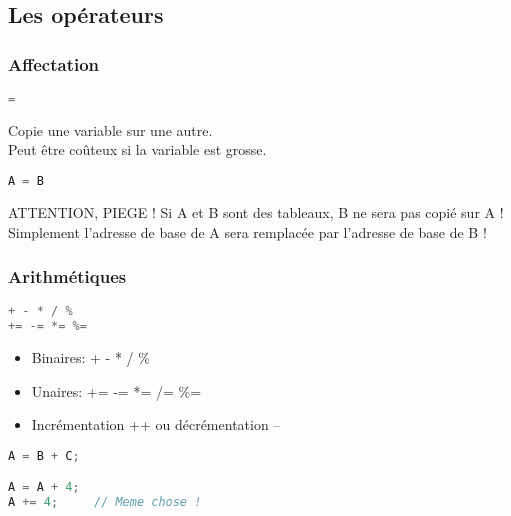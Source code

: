 \documentclass{beamer}
\begin{document}
\subsection{Les opérateurs}
\begin{frame}[fragile=singleslide,shrink=20]
\frametitle{Affectation}
\begin{lstlisting}[language=c++]
=
\end{lstlisting}

Copie une variable sur une autre. \\
Peut être coûteux si la variable est grosse. \\
\begin{lstlisting}[language=c++]
A = B
\end{lstlisting}
\begin{block}{ATTENTION, PIEGE !}
Si A et B sont des tableaux, B ne sera pas copié sur A ! \\
Simplement l'adresse de base de A sera remplacée par l'adresse de base de B ! \\
\end{block}
\end{frame}

\begin{frame}[fragile=singleslide,shrink=20]
\frametitle{Arithmétiques}
\begin{lstlisting}[language=c++]
+ - * / %
+= -= *= %=
\end{lstlisting}

\begin{itemize}
\item{Binaires: + - * / \%}
\item{Unaires: += -= *= /= \%=}
\item{Incrémentation ++ ou décrémentation --}
\end{itemize}

\begin{lstlisting}[language=c++]
A = B + C;

A = A + 4;
A += 4;     // Meme chose !
\end{lstlisting}
\end{frame}
\end{document}
